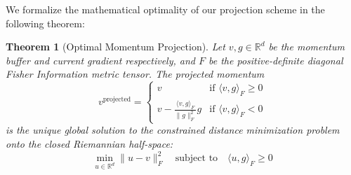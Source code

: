 \documentclass{article}
\theoremstyle{plain}
\newtheorem{theorem}{Theorem}[section]
\theoremstyle{definition}
\theoremstyle{remark}
\begin{document}
We formalize the mathematical optimality of our projection scheme in the following theorem:

\begin{theorem}[Optimal Momentum Projection]
Let $v, g \in \mathbb{R}^d$ be the momentum buffer and current gradient respectively, and $F$ be the positive-definite diagonal Fisher Information metric tensor. The projected momentum
\begin{equation}
    v^{\text{projected}} = \begin{cases}
        v & \text{if } \langle v, g \rangle_F \ge 0 \\
        v - \frac{\langle v, g \rangle_F}{\|g\|_F^2} g & \text{if } \langle v, g \rangle_F < 0
    \end{cases}
\end{equation}
is the unique global solution to the constrained distance minimization problem onto the closed Riemannian half-space:
\begin{equation}
    \min_{u \in \mathbb{R}^d} \|u - v\|_F^2 \quad \text{subject to} \quad \langle u, g \rangle_F \ge 0
\end{equation}
\end{theorem}
\end{document}
